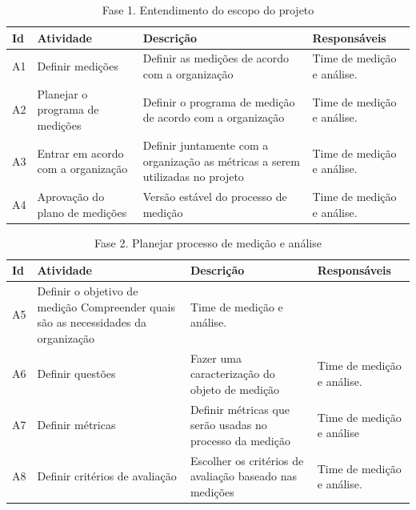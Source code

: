 \begin{table}[H]
\centering
\begin{tabular}{|p{1cm}|p{2cm}|p{5cm}|p{3cm}|}
\hline
	\textbf{Id} &
	\textbf{Atividade} &
	\textbf{Descrição} &
  \textbf{Responsáveis}
	\\ \hline
	A1 &
	Definir medições &
	Definir as medições de acordo com a organização &
	Time de medição e análise.
	\\ \hline
	A2 &
	Planejar o programa de medições &
	Definir o programa de medição de acordo com a organização &
	Time de medição e análise.
	\\ \hline
	A3 &
	Entrar em acordo com a organização &
	Definir juntamente com a organização as métricas a serem utilizadas no projeto &
	Time de medição e análise.
	\\ \hline
	A4 &
	Aprovação do plano de medições &
	Versão estável do processo de medição &
	Time de medição e análise.
	\\ \hline

\end{tabular}
\caption{Fase 1. Entendimento do escopo do projeto}
\label{tab:atividades_fase_1}
\end{table}

\begin{table}[H]
\centering
\begin{tabular}{|p{1cm}|p{2cm}|p{5cm}|p{3cm}|}
\hline
	\textbf{Id} &
	\textbf{Atividade} &
	\textbf{Descrição} &
  \textbf{Responsáveis}
	\\ \hline
	A5 &
	Definir o objetivo de medição
 	Compreender quais são as necessidades da organização &
	Time de medição e análise.
	\\ \hline
	A6 &
	Definir questões &
	Fazer uma caracterização do objeto de medição &
	Time de medição e análise.
	\\ \hline
	A7 &
	Definir métricas &
	Definir métricas que serão usadas no processo da medição &
	Time de medição e análise
	\\ \hline
	A8 &
	Definir critérios de avaliação &
	Escolher os critérios de avaliação baseado nas medições &
	Time de medição e análise.
	\\ \hline
\end{tabular}
\caption{Fase 2. Planejar processo de medição e análise}
\label{tab:atividades_fase_2}
\end{table}

